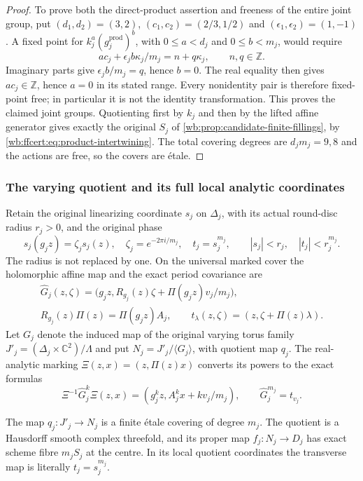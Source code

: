 \begin{proof}
To prove both the direct-product assertion and freeness of the entire
joint group, put $(d_1,d_2)=(3,2)$, $(c_1,c_2)=(2/3,1/2)$ and
$(\epsilon_1,\epsilon_2)=(1,-1)$. A fixed point for $k_j^a
(g_j^{\mathrm{prod}})^b$, with $0\le a<d_j$ and $0\le b<m_j$,
would require
\[
 ac_j+\epsilon_jb\kappa_j/m_j=n+q\kappa_j,
 \qquad n,q\in\mathbb Z.
 \tag{FF22}\label{wb:ffcert:eq:joint-freeness}
\]
Imaginary parts give $\epsilon_jb/m_j=q$, hence $b=0$. The real
equality then gives $ac_j\in\mathbb Z$, hence $a=0$ in its stated
range. Every nonidentity pair is therefore fixed-point free; in
particular it is not the identity transformation. This proves the
claimed joint groups. Quotienting first by $k_j$ and then by the lifted
affine generator gives exactly the original $S_j$ of
\cref{wb:prop:candidate-finite-fillings}, by
\eqref{wb:ffcert:eq:product-intertwining}. The total covering degrees are
$d_jm_j=9,8$ and the actions are free, so the covers are \'etale.
\end{proof}

\subsubsection{The varying quotient and its full local analytic coordinates}

Retain the original linearizing coordinate $s_j$ on $\Delta_j$, with
its actual round-disc radius $r_j>0$, and the original phase
\[
 s_j(g_jz)=\zeta_js_j(z),\quad
 \zeta_j=e^{-2\pi i/m_j},\quad t_j=s_j^{m_j},
 \qquad |s_j|<r_j,\quad |t_j|<r_j^{m_j}.
 \tag{FF23}\label{wb:ffcert:eq:disc-and-phase}
\]
The radius is not replaced by one. On the universal marked cover the
holomorphic affine map and the exact period covariance are
\[
\begin{gathered}
 \widehat G_j(z,\zeta)
  =\bigl(g_jz,R_{g_j}(z)\zeta+\Pi(g_jz)v_j/m_j\bigr),\\
 R_{g_j}(z)\Pi(z)=\Pi(g_jz)A_j,
 \qquad t_\lambda(z,\zeta)=(z,\zeta+\Pi(z)\lambda).
\end{gathered}
\tag{FF24}\label{wb:ffcert:eq:varying-action}
\]
Let $G_j$ denote the induced map of the original varying torus family
$J'_j=(\Delta_j\times\mathbb C^2)/\Lambda$ and put
$N_j=J'_j/\langle G_j\rangle$, with quotient map $q_j$.
The real-analytic marking $\Xi(z,x)=(z,\Pi(z)x)$ converts its powers
to the exact formulas
\[
 \Xi^{-1}\widehat G_j^k\Xi(z,x)
   =(g_j^kz,A_j^kx+kv_j/m_j),\qquad
 \widehat G_j^{m_j}=t_{v_j}.
 \tag{FF25}\label{wb:ffcert:eq:varying-powers}
\]

\begin{proposition}
\label{wb:ffcert:prop:quotient-charts}
The map $q_j:J'_j\to N_j$ is a finite \'etale covering of degree
$m_j$. The quotient is a Hausdorff smooth complex threefold, and its
proper map $f_j:N_j\to D_j$ has exact scheme fibre $m_jS_j$ at the
centre. In its local quotient coordinates the transverse map is
literally $t_j=s_j^{m_j}$.
\end{proposition}

